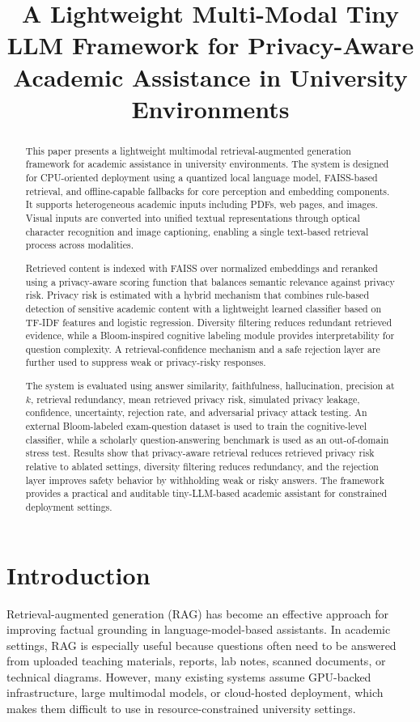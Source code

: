 \documentclass[conference]{IEEEtran}
\title{A Lightweight Multi-Modal Tiny LLM Framework for Privacy-Aware Academic Assistance in University Environments}
\author{\IEEEauthorblockN{Student Name}
\IEEEauthorblockA{Department of CSE\\
University Name\\
Email}}
\begin{document}
\maketitle

\begin{abstract}
This paper presents a lightweight multimodal retrieval-augmented generation framework for academic assistance in university environments. The system is designed for CPU-oriented deployment using a quantized local language model, FAISS-based retrieval, and offline-capable fallbacks for core perception and embedding components. It supports heterogeneous academic inputs including PDFs, web pages, and images. Visual inputs are converted into unified textual representations through optical character recognition and image captioning, enabling a single text-based retrieval process across modalities.

Retrieved content is indexed with FAISS over normalized embeddings and reranked using a privacy-aware scoring function that balances semantic relevance against privacy risk. Privacy risk is estimated with a hybrid mechanism that combines rule-based detection of sensitive academic content with a lightweight learned classifier based on TF-IDF features and logistic regression. Diversity filtering reduces redundant retrieved evidence, while a Bloom-inspired cognitive labeling module provides interpretability for question complexity. A retrieval-confidence mechanism and a safe rejection layer are further used to suppress weak or privacy-risky responses.

The system is evaluated using answer similarity, faithfulness, hallucination, precision at $k$, retrieval redundancy, mean retrieved privacy risk, simulated privacy leakage, confidence, uncertainty, rejection rate, and adversarial privacy attack testing. An external Bloom-labeled exam-question dataset is used to train the cognitive-level classifier, while a scholarly question-answering benchmark is used as an out-of-domain stress test. Results show that privacy-aware retrieval reduces retrieved privacy risk relative to ablated settings, diversity filtering reduces redundancy, and the rejection layer improves safety behavior by withholding weak or risky answers. The framework provides a practical and auditable tiny-LLM-based academic assistant for constrained deployment settings.
\end{abstract}

\section{Introduction}
Retrieval-augmented generation (RAG) has become an effective approach for improving factual grounding in language-model-based assistants. In academic settings, RAG is especially useful because questions often need to be answered from uploaded teaching materials, reports, lab notes, scanned documents, or technical diagrams. However, many existing systems assume GPU-backed infrastructure, large multimodal models, or cloud-hosted deployment, which makes them difficult to use in resource-constrained university settings.
\end{document}
